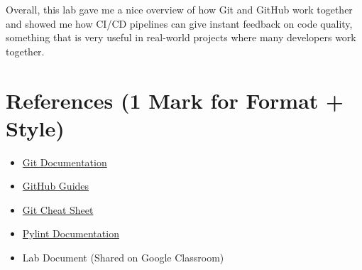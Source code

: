\documentclass[10pt,a4paper]{report}
\begin{document}
Overall, this lab gave me a nice overview of how Git and GitHub work together and showed me how CI/CD pipelines can give instant feedback on code quality, something that is very useful in real-world projects where many developers work together.




\section{References (1 Mark for Format + Style)}
\begin{itemize}[itemsep=0.01em, topsep=0pt]
    \item \href{https://git-scm.com/doc}{Git Documentation}
    \item \href{https://docs.github.com/en}{GitHub Guides}
    \item \href{https://education.github.com/git-cheat-sheet-education.pdf}{Git Cheat Sheet}
    \item \href{https://docs.pylint.org/}{Pylint Documentation}
    \item Lab Document (Shared on Google Classroom)
\end{itemize}
\end{document}
